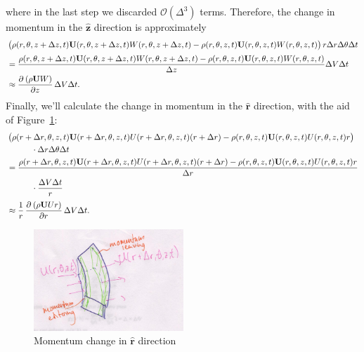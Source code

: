 \documentclass{article}
\def\*#1{\mathbf{#1}}
\newcommand{\rhat}{\mathbf{\hat{r}}}
\newcommand{\zhat}{\mathbf{\hat{z}}}
\begin{document}
%
where in the last step we discarded $\mathcal{O}(\Delta^3)$ terms.
Therefore, the change in momentum in the $\zhat$ direction is
approximately
%
\begin{align*}
    &
    \del{
        \rho(r, \theta, z + \Delta z, t)
        \*U(r, \theta, z + \Delta z, t)
        W(r, \theta, z + \Delta z, t)
        - \rho(r, \theta, z, t)
        \*U(r, \theta, z, t)
        W(r, \theta, z, t)
    } r \Delta r \Delta \theta \Delta t \\[0.5ex]
    &=
    \frac{
        \rho(r, \theta, z + \Delta z, t)
        \*U(r, \theta, z + \Delta z, t)
        W(r, \theta, z + \Delta z, t)
        - \rho(r, \theta, z, t)
        \*U(r, \theta, z, t)
        W(r, \theta, z, t)
    }{\Delta z} \Delta V \Delta t \\
    &\approx \dpd{\del{\rho \*U W}}{z} \Delta V \Delta t
    .
\end{align*}
%
Finally, we'll calculate the change in momentum in the $\rhat$
direction, with the aid of Figure~\ref{figure:d-r}:
%
\begin{align*}
    &
    \del{
        \rho(r + \Delta r, \theta, z, t)
        \*U(r + \Delta r, \theta, z, t)
        U(r + \Delta r , \theta, z, t)
        (r + \Delta r)
        - \rho(r, \theta, z, t)
        \*U(r, \theta, z, t)
        U(r, \theta, z, t)
        r
    }
    \\
    &\qquad \quad \cdot \Delta r \Delta \theta \Delta t
    \\
    &=
    \frac{
        \rho(r + \Delta r, \theta, z, t)
        \*U(r + \Delta r, \theta, z, t)
        U(r + \Delta r , \theta, z, t)
        (r + \Delta r)
        - \rho(r, \theta, z, t)
        \*U(r, \theta, z, t)
        U(r, \theta, z, t)
        r
    }{\Delta r}
    \\
    &\qquad \quad \cdot \frac{\Delta V \Delta t}{r}
    \\[0.5ex]
    &\approx \frac{1}{r} \dpd{\del{\rho \*U U r}}{r} \Delta V \Delta t
    .
\end{align*}
%
\begin{figure}[!ht]
    \includegraphics[width=15.2em]{d-r}
    \centering
    \caption{Momentum change in $\rhat$ direction}
    \label{figure:d-r}
\end{figure}
\end{document}
